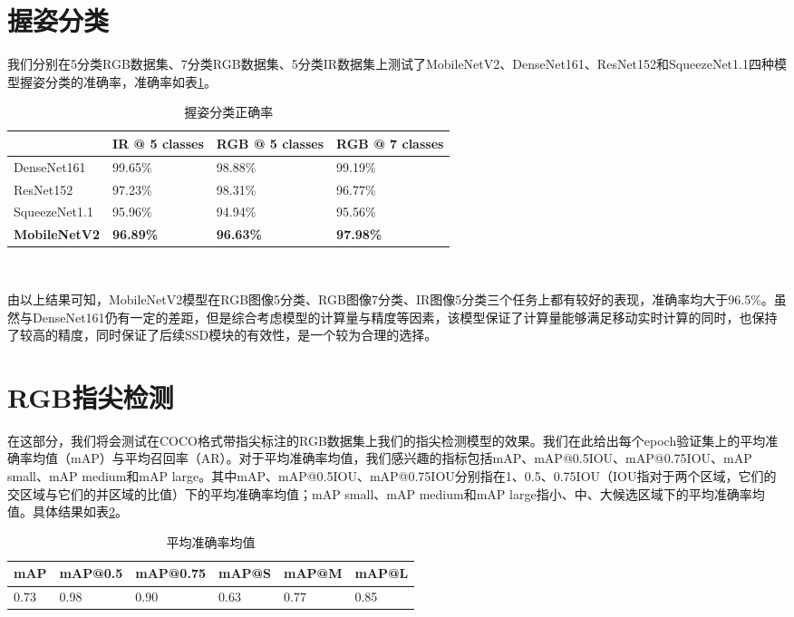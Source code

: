 \section{握姿分类}

我们分别在5分类RGB数据集、7分类RGB数据集、5分类IR数据集上测试了MobileNetV2、DenseNet161、ResNet152和SqueezeNet1.1四种模型握姿分类的准确率，准确率如表\ref{tbl:ges_class}。

\begin{table}[htbp]
\centering
\caption{握姿分类正确率}
\label{tbl:ges_class}
\begin{tabular}{p{80 pt}p{100 pt}p{100 pt}p{100 pt}}
 \toprule
   & IR @ 5 classes & RGB @ 5 classes & RGB @ 7 classes\\
 \midrule
    DenseNet161 & 99.65\% & 98.88\% & 99.19\% \\
    ResNet152 & 97.23\% & 98.31\% & 96.77\% \\
    SqueezeNet1.1 & 95.96\% & 94.94\% & 95.56\% \\
    \textbf{MobileNetV2} & \textbf{96.89\%} & \textbf{96.63\%} & \textbf{97.98\%} \\
\bottomrule
 \end{tabular}\\[2pt]
\end{table}

由以上结果可知，MobileNetV2模型在RGB图像5分类、RGB图像7分类、IR图像5分类三个任务上都有较好的表现，准确率均大于96.5\%。虽然与DenseNet161仍有一定的差距，但是综合考虑模型的计算量与精度等因素，该模型保证了计算量能够满足移动实时计算的同时，也保持了较高的精度，同时保证了后续SSD模块的有效性，是一个较为合理的选择。

\section{RGB指尖检测}

在这部分，我们将会测试在COCO格式带指尖标注的RGB数据集上我们的指尖检测模型的效果。我们在此给出每个epoch验证集上的平均准确率均值（mAP）与平均召回率（AR）。对于平均准确率均值，我们感兴趣的指标包括mAP、mAP@0.5IOU、mAP@0.75IOU、mAP small、mAP medium和mAP large。其中mAP、mAP@0.5IOU、mAP@0.75IOU分别指在1、0.5、0.75IOU（IOU指对于两个区域，它们的交区域与它们的并区域的比值）下的平均准确率均值；mAP small、mAP medium和mAP large指小、中、大候选区域下的平均准确率均值。具体结果如表\ref{tbl:fingertip_precision}。

\begin{table}[htbp]
\centering
\caption{平均准确率均值}
\label{tbl:fingertip_precision}
\begin{tabular}{p{60 pt}p{60 pt}p{60 pt}p{60 pt}p{60 pt}p{60 pt}}
 \toprule
  mAP & mAP@0.5 & mAP@0.75 & mAP@S & mAP@M & mAP@L\\
 \midrule
    0.73 & 0.98 & 0.90 & 0.63 & 0.77 & 0.85 \\
\bottomrule
 \end{tabular}\\[2pt]
\end{table}

